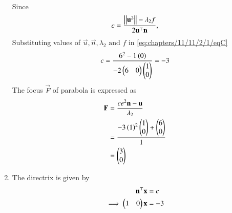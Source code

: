 \begin{enumerate}
\begin{align}
\end{align}
Since
\begin{align}
	\label{eq:chapters/11/11/2/1/eqC}
	c = \frac{\left\lVert\mathbf{u}^2\right\rVert-\lambda_2f}{2\mathbf{u}^\top\mathbf{n}},
\end{align}
Substituting values of $\vec{u}, \vec{n}, \lambda_2 \text{ and } f$ in \eqref{eq:chapters/11/11/2/1/eqC}
\begin{align}
	c &= \frac{6^2-1\left(0\right)}{-2 \begin{pmatrix}6 & 0\end{pmatrix}\begin{pmatrix}1 \\ 0\end{pmatrix}} = -3 \\
\end{align}
The focus $\vec{F}$ of parabola is expressed as
\begin{align}
	\mathbf{F} &= \frac{ce^2\mathbf{n}-\mathbf{u}}{\lambda_2} \\
	&= \frac{-3\left(1\right)^2\begin{pmatrix}1 \\0\end{pmatrix} + \begin{pmatrix}6 \\ 0\end{pmatrix}}{1} \\
	&= \begin{pmatrix}3 \\ 0\end{pmatrix}
\end{align}
\item The directrix is given by
\begin{align}
	\mathbf{n}^\top\mathbf{x} &= c \\
	\label{eq:chapters/11/11/2/1/eqDir}
\implies	\begin{pmatrix}1 & 0\end{pmatrix}\mathbf{x} &= -3
\end{align}


\end{enumerate}
